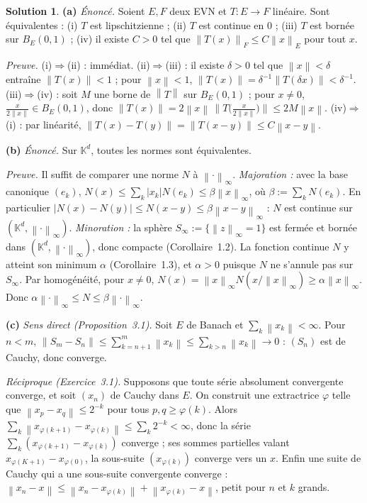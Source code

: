 \documentclass[11pt,a4paper]{article}
\newcommand{\K}{\mathbb{K}}
\newcommand{\norm}[1]{\left\|#1\right\|}
\theoremstyle{definition}
\newtheorem*{solution}{Solution}
\begin{document}
\begin{solution}
\noindent\textbf{(a)} \emph{Énoncé.} Soient $E,F$ deux EVN et $T:E\to F$ linéaire. Sont équivalentes : (i) $T$ est lipschitzienne ; (ii) $T$ est continue en $0$ ; (iii) $T$ est bornée sur $B_E(0,1)$ ; (iv) il existe $C>0$ tel que $\norm{T(x)}_F\le C\norm x_E$ pour tout $x$.

\emph{Preuve.} (i)$\Rightarrow$(ii) : immédiat. (ii)$\Rightarrow$(iii) : il existe $\delta>0$ tel que $\norm x<\delta$ entraîne $\norm{T(x)}<1$ ; pour $\norm x<1$, $\norm{T(x)}=\delta^{-1}\norm{T(\delta x)}<\delta^{-1}$. (iii)$\Rightarrow$(iv) : soit $M$ une borne de $\norm{T}$ sur $B_E(0,1)$ ; pour $x\ne0$, $\frac x{2\norm x}\in B_E(0,1)$, donc $\norm{T(x)}=2\norm x\,\big\|T\big(\frac x{2\norm x}\big)\big\|\le2M\norm x$. (iv)$\Rightarrow$(i) : par linéarité, $\norm{T(x)-T(y)}=\norm{T(x-y)}\le C\norm{x-y}$.

\medskip
\noindent\textbf{(b)} \emph{Énoncé.} Sur $\K^d$, toutes les normes sont équivalentes.

\emph{Preuve.} Il suffit de comparer une norme $N$ à $\norm\cdot_\infty$. \emph{Majoration :} avec la base canonique $(e_k)$, $N(x)\le\sum_k|x_k|N(e_k)\le\beta\norm x_\infty$, où $\beta:=\sum_kN(e_k)$. En particulier $|N(x)-N(y)|\le N(x-y)\le\beta\norm{x-y}_\infty$ : $N$ est continue sur $(\K^d,\norm\cdot_\infty)$. \emph{Minoration :} la sphère $S_\infty:=\{\norm z_\infty=1\}$ est fermée et bornée dans $(\K^d,\norm\cdot_\infty)$, donc compacte (Corollaire~1.2). La fonction continue $N$ y atteint son minimum $\alpha$ (Corollaire~1.3), et $\alpha>0$ puisque $N$ ne s'annule pas sur $S_\infty$. Par homogénéité, pour $x\ne0$, $N(x)=\norm x_\infty N(x/\norm x_\infty)\ge\alpha\norm x_\infty$. Donc $\alpha\norm\cdot_\infty\le N\le\beta\norm\cdot_\infty$.

\medskip
\noindent\textbf{(c)} \emph{Sens direct (Proposition~3.1).} Soit $E$ de Banach et $\sum_k\norm{x_k}<\infty$. Pour $n<m$, $\norm{S_m-S_n}\le\sum_{k=n+1}^m\norm{x_k}\le\sum_{k>n}\norm{x_k}\to0$ : $(S_n)$ est de Cauchy, donc converge.

\emph{Réciproque (Exercice~3.1).} Supposons que toute série absolument convergente converge, et soit $(x_n)$ de Cauchy dans $E$. On construit une extractrice $\varphi$ telle que $\norm{x_p-x_q}\le2^{-k}$ pour tous $p,q\ge\varphi(k)$. Alors $\sum_k\norm{x_{\varphi(k+1)}-x_{\varphi(k)}}\le\sum_k2^{-k}<\infty$, donc la série $\sum_k(x_{\varphi(k+1)}-x_{\varphi(k)})$ converge ; ses sommes partielles valant $x_{\varphi(K+1)}-x_{\varphi(0)}$, la sous-suite $(x_{\varphi(k)})$ converge vers un $x$. Enfin une suite de Cauchy qui a une sous-suite convergente converge : $\norm{x_n-x}\le\norm{x_n-x_{\varphi(k)}}+\norm{x_{\varphi(k)}-x}$, petit pour $n$ et $k$ grands.


\end{solution}
\end{document}
